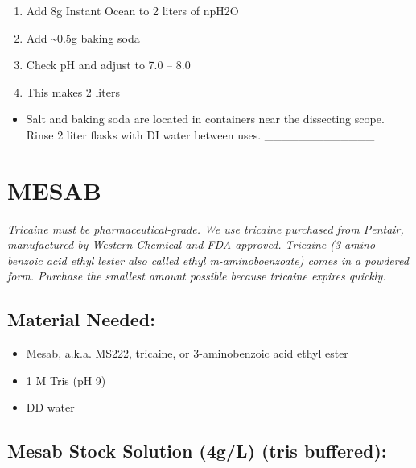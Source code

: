 \documentclass[
]{book}
\providecommand{\tightlist}{%
  \setlength{\itemsep}{0pt}\setlength{\parskip}{0pt}}
\begin{document}
\begin{enumerate}
\def\labelenumi{\arabic{enumi}.}
\tightlist
\item
  Add 8g Instant Ocean to 2 liters of npH2O
\item
  Add \textasciitilde0.5g baking soda
\item
  Check pH and adjust to 7.0 -- 8.0
\item
  This makes 2 liters
\end{enumerate}

\begin{itemize}
\tightlist
\item
  Salt and baking soda are located in containers near the dissecting scope. Rinse 2 liter flasks with DI water between uses.
  \_\_\_\_\_\_\_\_\_\_\_\_\_
\end{itemize}

\hypertarget{mesab}{%
\section{MESAB}\label{mesab}}

\emph{Tricaine must be pharmaceutical-grade. We use tricaine purchased from Pentair, manufactured by Western Chemical and FDA approved. Tricaine (3-amino benzoic acid ethyl lester also called ethyl m-aminoboenzoate) comes in a powdered form. Purchase the smallest amount possible because tricaine expires quickly.}

\hypertarget{material-needed-1}{%
\subsection{Material Needed:}\label{material-needed-1}}

\begin{itemize}
\tightlist
\item
  Mesab, a.k.a. MS222, tricaine, or 3-aminobenzoic acid ethyl ester
\item
  1 M Tris (pH 9)
\item
  DD water
\end{itemize}

\hypertarget{mesab-stock-solution-4gl-tris-buffered}{%
\subsection{Mesab Stock Solution (4g/L) (tris buffered):}\label{mesab-stock-solution-4gl-tris-buffered}}
\end{document}
